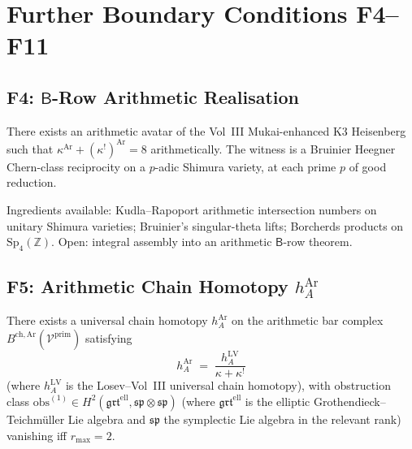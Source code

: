 \section{Further Boundary Conditions F4--F11}
\label{v4-arith:of:further-frontiers}

\subsection{F4: \(\mathsf{B}\)-Row Arithmetic Realisation}
\label{v4-arith:of:F4-B-row}

\begin{conjecture}
\label{v4-arith:conj:F4-B-row}
There exists an arithmetic avatar of the Vol~III Mukai-enhanced
K3 Heisenberg such that \(\kappa^{\mathrm{Ar}}+(\kappa^{!})^{\mathrm{Ar}}=8\)
arithmetically. The witness is a Bruinier Heegner Chern-class
reciprocity on a \(p\)-adic Shimura variety, at each prime \(p\) of
good reduction.
\end{conjecture}

\begin{remark}
Ingredients available: Kudla--Rapoport arithmetic intersection
numbers on unitary Shimura varieties; Bruinier's singular-theta
lifts; Borcherds products on \(\mathrm{Sp}_{4}(\mathbb{Z})\). Open:
integral assembly into an arithmetic \(\mathsf{B}\)-row theorem.
\end{remark}

\subsection{F5: Arithmetic Chain Homotopy \(h^{\mathrm{Ar}}_{A}\)}
\label{v4-arith:of:F5-chain-homotopy}

\begin{conjecture}
\label{v4-arith:conj:F5-chain-homotopy}
There exists a universal chain homotopy \(h^{\mathrm{Ar}}_{A}\) on
the arithmetic bar complex \(B^{\mathrm{ch,Ar}}(\mathcal{V}^{\mathrm{prim}})\)
satisfying
\begin{equation}
h^{\mathrm{Ar}}_{A}\;=\;\frac{h^{\mathrm{LV}}_{A}}{\kappa+\kappa^{!}}
\end{equation}
(where \(h^{\mathrm{LV}}_{A}\) is the Losev--Vol~III universal
chain homotopy), with obstruction class \(\mathrm{obs}^{(1)}\in H^{2}(\mathfrak{grt}^{\mathrm{ell}},\mathfrak{sp}\otimes\mathfrak{sp})\)
(where \(\mathfrak{grt}^{\mathrm{ell}}\) is the elliptic
Grothendieck--Teichmüller Lie algebra and \(\mathfrak{sp}\) the symplectic
Lie algebra in the relevant rank) vanishing iff \(r_{\max}=2\).
\end{conjecture}

